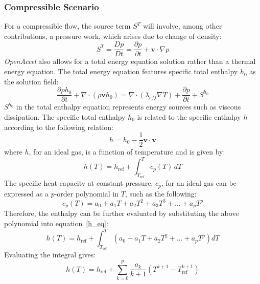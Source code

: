 \documentclass[12pt]{extarticle}
\newcommand{\<}{\langle}
\renewcommand{\>}{\rangle}
\theoremstyle{definition}
\begin{document}
\subsubsection{Compressible Scenario}
For a compressible flow, the source term $S^T$ will involve, among other contributions, a pressure work, which arises due to change of density:
\begin{equation}
    S^T = \frac{Dp}{Dt} = \frac{\partial p}{\partial t} + \textbf{v} \cdot \nabla p
\end{equation}
\textit{OpenAccel} also allows for a total energy equation solution rather than a thermal energy equation. The total energy equation features specific total enthalpy $h_0$ as the solution field:
\begin{equation}
    \frac{\partial \rho h_{0}}{\partial t} + \nabla \cdot (\rho \textbf{v} h_{0}) = \nabla \cdot (\lambda_{eff} \nabla T) + \frac{\partial p}{\partial t} +S^{h_{0}} \label{eq:ener_full_tot}
\end{equation}
$S^{h_{0}}$ in the total enthalpy equation represents energy sources such as viscous dissipation. The specific total enthalpy $h_0$ is related to the specific enthalpy $h$ according to the following relation:
\begin{equation}
    h = h_0 - \frac{1}{2} \textbf{v} \cdot \textbf{v}
\end{equation}
where $h$, for an ideal gas, is a function of temperature and is given by:
\begin{equation}\label{h_eq}
    h(T) = h_{\text{ref}} + \int_{T_{\text{ref}}}^{T} c_p(T) \, dT
\end{equation}
The specific heat capacity at constant pressure, $c_p$, for an ideal gas can be expressed as a $p$-order polynomial in $T$, such as the following:
\begin{equation}
    c_p(T) = a_0 + a_1 T + a_2 T^2 + a_3 T^3 + \dots + a_p T^p
\end{equation}
Therefore, the enthalpy can be further evaluated by substituting the above polynomial into equation~\eqref{h_eq}:
\begin{equation}
    h(T) = h_{\text{ref}} + \int_{T_{\text{ref}}}^{T} \left( a_0 + a_1 T + a_2 T^2 + \dots + a_p T^p \right) dT
\end{equation}
Evaluating the integral gives:
\begin{equation}\label{h_formula}
    h(T) = h_{\text{ref}} + \sum_{k=0}^{p} \frac{a_k}{k+1} \left( T^{k+1} - T_{\text{ref}}^{k+1} \right)
\end{equation}
\end{document}
